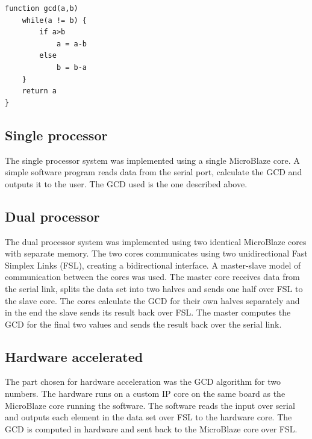 \documentclass[11pt]{article}
\begin{document}
\begin{lstlisting}[float=tbh,frame=tb,captionpos=b,caption={Euclidean subtracion algorithm},label=lst:gcd]
function gcd(a,b)
	while(a != b) {
		if a>b
			a = a-b
		else
			b = b-a
	}
	return a
}
\end{lstlisting}

\subsection{Single processor}
The single processor system was implemented using a single MicroBlaze core. A simple software program reads data from the serial port, calculate the GCD and outputs it to the user. The GCD used is the one described above.

\subsection{Dual processor}
The dual processor system was implemented using two identical MicroBlaze cores with separate memory. The two cores communicates using two unidirectional Fast Simplex Links (FSL), creating a bidirectional interface. A master-slave model of communication between the cores was used. The master core receives data from the serial link, splits the data set into two halves and sends one half over FSL to the slave core. The cores calculate the GCD for their own halves separately and in the end the slave sends its result back over FSL. The master computes the GCD for the final two values and sends the result back over the serial link.
\subsection{Hardware accelerated}
The part chosen for hardware acceleration was the GCD algorithm for two numbers. The hardware runs on a custom IP core on the same board as the MicroBlaze core running the software. The software reads the input over serial and outputs each element in the data set over FSL to the hardware core. The GCD is computed in hardware and sent back to the MicroBlaze core over FSL.

\end{document}
